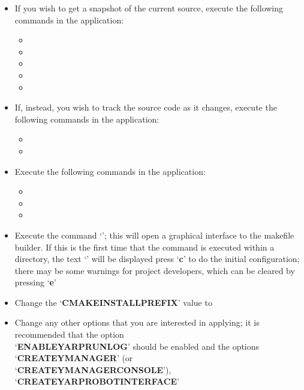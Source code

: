 \begin{itemize}
\item If you wish to get a snapshot of the current source, execute the following
commands in the  application:
\begin{itemize}
\item {}
\item\exSp{}
\item\exSp{}
\item\exSp{}
\item\exSp{}
\end{itemize}
\item\exSp{}If, instead, you wish to track the source code as it changes, execute the
following commands in the  application:
\begin{itemize}
\item {}
\item\exSp{}
\end{itemize}
\item\exSp{}Execute the following commands in the  application:
\begin{itemize}
\item {}
\item\exSp{}
\item\exSp{}
\end{itemize}
\item\exSp{}Execute the command `'; this will open a graphical
interface to the makefile builder. If this is the first time that the command is executed
within a directory, the text `' will be displayed \longDash{} press
`\textbf{c}' to do the initial configuration; there may be some warnings for project
developers, which can be cleared by pressing `\textbf{e}'
\item\exSp{}Change the `\textbf{CMAKE\fUS{}INSTALL\fUS{}PREFIX}' value to
\item\exSp{}Change any other options that you are interested in applying; it is
recommended that the option\\
`\textbf{ENABLE\fUS{}YARPRUN\fUS{}LOG}' should be enabled and the options
`\textbf{CREATE\fUS{}YMANAGER}' (or\\
`\textbf{CREATE\fUS{}YMANAGER\fUS{}CONSOLE}'), `\textbf{CREATE\fUS{}YARPROBOTINTERFACE}'

\end{itemize}
